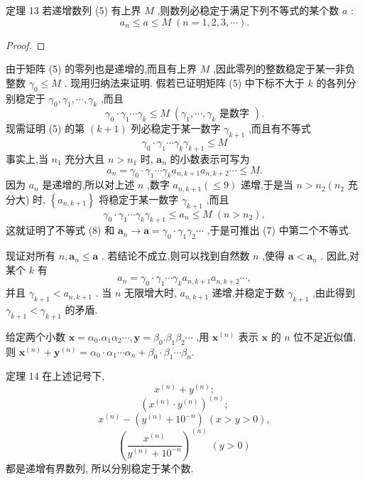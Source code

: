 定理 13 若递增数列 (5) 有上界 \(M\) ,则数列必稳定于满足下列不等式的某个数 \(a\) :
\[
{a}_{n} \leq  a \leq  M\;\left( {n = 1,2,3,\cdots }\right) . \tag{7}
\]
\begin{proof}

\end{proof}
由于矩阵 (5) 的零列也是递增的,而且有上界 \(M\) ,因此零列的整数稳定于某一非负整数 \({\gamma }_{0} \leq  M\) . 现用归纳法来证明. 假若已证明矩阵 (5) 中下标不大于 \(k\) 的各列分别稳定于 \({\gamma }_{0},{\gamma }_{1},\cdots ,{\gamma }_{k}\) ,而且
\[
{\gamma }_{0} \cdot  {\gamma }_{1}\cdots {\gamma }_{k} \leq  M\;\left( {{\gamma }_{1},\cdots ,{\gamma }_{k}\text{ 是数字 }}\right) .
\]
现需证明 (5) 的第 \(\left( {k + 1}\right)\) 列必稳定于某一数字 \({\gamma }_{k + 1}\) ,而且有不等式
\[
{\gamma }_{0} \cdot  {\gamma }_{1}\cdots {\gamma }_{k}{\gamma }_{k + 1} \leq  M \tag{8}
\]
事实上,当 \({n}_{1}\) 充分大且 \(n > {n}_{1}\) 时, \({\mathbf{a}}_{n}\) 的小数表示可写为
\[
{a}_{n} = {\gamma }_{0} \cdot  {\gamma }_{1}\cdots {\gamma }_{k}{a}_{n,k + 1}{a}_{n,k + 2}\cdots  \leq  M.
\]
因为 \({a}_{n}\) 是递增的,所以对上述 \(n\) ,数字 \({a}_{n,k + 1}\left( { \leq  9}\right)\) 递增,于是当 \(n > {n}_{2}\left( {n}_{2}\right.\) 充分大) 时, \(\left\{  {a}_{n,k + 1}\right\}\) 将稳定于某一数字 \({\gamma }_{k + 1}\) ,而且
\[
{\gamma }_{0} \cdot  {\gamma }_{1}\cdots {\gamma }_{k}{\gamma }_{k + 1} \leq  {a}_{n} \leq  M\;\left( {n > {n}_{2}}\right) ,
\]
这就证明了不等式 (8) 和 \({\mathbf{a}}_{n} \rightarrow  \mathbf{a} = {\gamma }_{0} \cdot  {\gamma }_{1}{\gamma }_{2}\cdots\) ,于是可推出 (7) 中第二个不等式.

现证对所有 \(n,{\mathbf{a}}_{n} \leq  \mathbf{a}\) . 若结论不成立,则可以找到自然数 \(n\) ,使得 \(\mathbf{a} < {\mathbf{a}}_{n}\) . 因此,对某个 \(k\) 有
\[
{a}_{n} = {\gamma }_{0} \cdot  {\gamma }_{1}\cdots {\gamma }_{k}{a}_{n,k + 1}{a}_{n,k + 2}\cdots ,
\]
并且 \({\gamma }_{k + 1} < {a}_{n,k + 1}\) . 当 \(n\) 无限增大时, \({a}_{n,k + 1}\) 递增,并稳定于数 \({\gamma }_{k + 1}\) ,由此得到 \({\gamma }_{k + 1} < {\gamma }_{k + 1}\) 的矛盾.

给定两个小数 \(\mathbf{x} = {\alpha }_{0}.{\alpha }_{1}{\alpha }_{2}\cdots ,\mathbf{y} = {\beta }_{0}.{\beta }_{1}{\beta }_{2}\cdots\) ,用 \({\mathbf{x}}^{\left( n\right) }\) 表示 \(\mathbf{x}\) 的 \(n\) 位不足近似值,则 \({\mathbf{x}}^{\left( n\right) } + {\mathbf{y}}^{\left( n\right) } = {\alpha }_{0} \cdot  {\alpha }_{1}\cdots {\alpha }_{n} + {\beta }_{0} \cdot  {\beta }_{1}\cdots {\beta }_{n}.\)

定理 14 在上述记号下,
\[
{x}^{\left( n\right) } + {y}^{\left( n\right) };
\]
\[
{\left( {x}^{\left( n\right) } \cdot  {y}^{\left( n\right) }\right) }^{\left( n\right) };
\]
\[
{x}^{\left( n\right) } - \left( {{y}^{\left( n\right) } + {10}^{-n}}\right) \;\left( {x > y > 0}\right) ,
\]
\[
{\left( \frac{{x}^{\left( n\right) }}{{y}^{\left( n\right) } + {10}^{-n}}\right) }^{\left( n\right) }\;\left( {y > 0}\right)  \tag{9}
\]
都是递增有界数列, 所以分别稳定于某个数.

